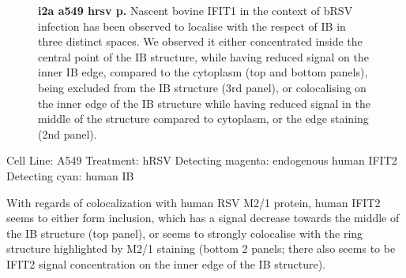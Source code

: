 \begin{figure}
\begin{subfigure}{1\textwidth}
    \end{subfigure}
    \caption[i2a a549 hrsv p]{\textbf{i2a a549 hrsv p.} Nascent bovine IFIT1 in the context of bRSV infection has been observed to localise with the respect of IB in three distinct spaces. We observed it either concentrated inside the central point of the IB structure, while having reduced signal on the inner IB edge, compared to the cytoplasm (top and bottom panels), being excluded from the IB structure (3rd panel), or colocalising on the inner edge of the IB structure while having reduced signal in the middle of the structure compared to cytoplasm, or the edge staining (2nd panel).}
    \label{fig:i2a a549 hrsv p}
\end{figure}

Cell Line: A549 \newline
Treatment: hRSV \newline
Detecting magenta: endogenous human IFIT2  \newline
Detecting cyan: human IB \newline

With regards of colocalization with human RSV M2/1 protein, human IFIT2 seems to either form inclusion, which has a signal decrease towards the middle of the IB structure (top panel), or seems to strongly colocalise with the ring structure highlighted by M2/1 staining (bottom 2 panels; there also seems to be IFIT2 signal concentration on the inner edge of the IB structure).

